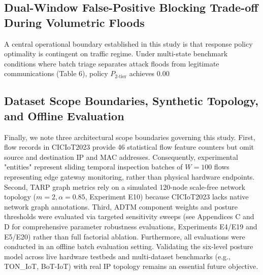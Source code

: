 \documentclass[journal,10pt,onecolumn]{IEEEtran}
\begin{document}
\subsection{Dual-Window False-Positive Blocking Trade-off During Volumetric Floods}
A central operational boundary established in this study is that response policy optimality is contingent on traffic regime. Under multi-state benchmark conditions where batch triage separates attack floods from legitimate communications (Table 6), policy $P_{2\text{-tier}}$ achieves 0.00%


\subsection{Dataset Scope Boundaries, Synthetic Topology, and Offline Evaluation}
Finally, we note three architectural scope boundaries governing this study. First, flow records in CICIoT2023 provide 46 statistical flow feature counters but omit source and destination IP and MAC addresses. Consequently, experimental "entities" represent sliding temporal inspection batches of $W=100$ flows representing edge gateway monitoring, rather than physical hardware endpoints. Second, TARP graph metrics rely on a simulated 120-node scale-free network topology ($m=2, \alpha=0.85$, Experiment E10) because CICIoT2023 lacks native network graph annotations. Third, ADTM component weights and posture thresholds were evaluated via targeted sensitivity sweeps (see Appendices C and D for comprehensive parameter robustness evaluations, Experiments E4/E19 and E5/E20) rather than full factorial ablation. Furthermore, all evaluations were conducted in an offline batch evaluation setting. Validating the six-level posture model across live hardware testbeds and multi-dataset benchmarks (e.g., TON_IoT, BoT-IoT) with real IP topology remains an essential future objective.
\end{document}
